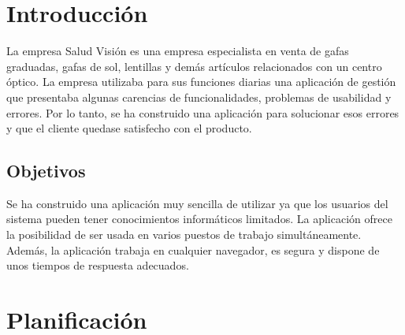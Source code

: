 \documentclass[a4paper,12pt]{article}
\begin{document}
\section{\fontsize{12}{1}\selectfont Introducción}
\noindent La empresa Salud Visión es una empresa especialista en venta de gafas graduadas, gafas de sol, lentillas y demás artículos relacionados con un centro óptico. La empresa utilizaba para sus funciones diarias una aplicación de gestión que presentaba algunas carencias de funcionalidades, problemas de usabilidad y errores. Por lo tanto, se ha construido una aplicación para solucionar esos errores y que el cliente quedase satisfecho con el producto.
\subsection {\fontsize{12}{1}\selectfont Objetivos}
\noindent Se ha construido una aplicación muy sencilla de utilizar ya que los usuarios del sistema pueden tener conocimientos informáticos limitados. La aplicación ofrece la posibilidad de ser usada en varios puestos de trabajo simultáneamente. Además, la aplicación trabaja en cualquier navegador, es segura y dispone de unos tiempos de respuesta adecuados. 
\section{\fontsize{12}{1}\selectfont Planificación}
\end{document}
